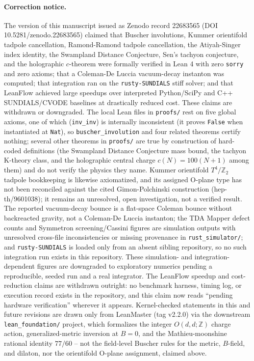 \documentclass[11pt,a4paper]{article}
\begin{document}
\paragraph{Correction notice.} The version of this manuscript issued as Zenodo record 22683565 (DOI 10.5281/zenodo.22683565) claimed that Buscher involutions, Kummer orientifold tadpole cancellation, Ramond-Ramond tadpole cancellation, the Atiyah-Singer index identity, the Swampland Distance Conjecture, Sen's tachyon conjecture, and the holographic $c$-theorem were formally verified in Lean 4 with zero \texttt{sorry} and zero axioms; that a Coleman-De Luccia vacuum-decay instanton was computed; that integration ran on the \texttt{rusty-SUNDIALS} stiff solver; and that LeanFlow achieved large speedups over interpreted Python/SciPy and C++ SUNDIALS/CVODE baselines at drastically reduced cost. These claims are withdrawn or downgraded. The local Lean files in \texttt{proofs/} rest on five global axioms, one of which (\texttt{inv\_inv}) is internally inconsistent (it proves \texttt{False} when instantiated at \texttt{Nat}), so \texttt{buscher\_involution} and four related theorems certify nothing; several other theorems in \texttt{proofs/} are true by construction of hard-coded definitions (the Swampland Distance Conjecture mass bound, the tachyon K-theory class, and the holographic central charge $c(N)=100(N+1)$ among them) and do not verify the physics they name. Kummer orientifold $T^4/\mathbb{Z}_2$ tadpole bookkeeping is likewise axiomatized, and its assigned O-plane type has not been reconciled against the cited Gimon-Polchinski construction (hep-th/9601038); it remains an unresolved, open investigation, not a verified result. The reported vacuum-decay bounce is a flat-space Coleman bounce without backreacted gravity, not a Coleman-De Luccia instanton; the TDA Mapper defect counts and Symmetron screening/Cassini figures are simulation outputs with unresolved cross-file inconsistencies or missing provenance in \texttt{rust\_simulator/}; and \texttt{rusty-SUNDIALS} is loaded only from an absent sibling repository, so no such integration run exists in this repository. These simulation- and integration-dependent figures are downgraded to exploratory numerics pending a reproducible, seeded run and a real integrator. The LeanFlow speedup and cost-reduction claims are withdrawn outright: no benchmark harness, timing log, or execution record exists in the repository, and this claim now reads ``pending hardware verification'' wherever it appears. Kernel-checked statements in this and future revisions are drawn only from LeanMaster (tag v2.2.0) via the downstream \texttt{lean\_foundation/} project, which formalizes the integer $O(d,d;\mathbb{Z})$ charge action, generalized-metric inversion at $B=0$, and the Mathieu-moonshine rational identity $77/60$ -- not the field-level Buscher rules for the metric, $B$-field, and dilaton, nor the orientifold O-plane assignment, claimed above.
\end{document}
